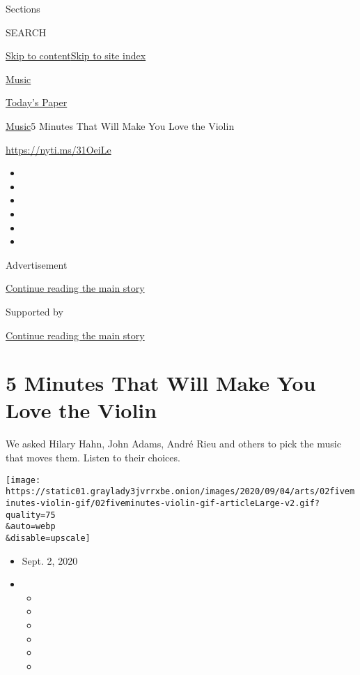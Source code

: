 Sections

SEARCH

\protect\hyperlink{site-content}{Skip to
content}\protect\hyperlink{site-index}{Skip to site index}

\href{https://www.nytimes3xbfgragh.onion/section/arts/music}{Music}

\href{https://myaccount.nytimes3xbfgragh.onion/auth/login?response_type=cookie\&client_id=vi}{}

\href{https://www.nytimes3xbfgragh.onion/section/todayspaper}{Today's
Paper}

\href{/section/arts/music}{Music}\textbar{}5 Minutes That Will Make You
Love the Violin

\url{https://nyti.ms/31OeiLe}

\begin{itemize}
\item
\item
\item
\item
\item
\item
\end{itemize}

Advertisement

\protect\hyperlink{after-top}{Continue reading the main story}

Supported by

\protect\hyperlink{after-sponsor}{Continue reading the main story}

\hypertarget{5-minutes-that-will-make-you-love-the-violin}{%
\section{5 Minutes That Will Make You Love the
Violin}\label{5-minutes-that-will-make-you-love-the-violin}}

We asked Hilary Hahn, John Adams, André Rieu and others to pick the
music that moves them. Listen to their choices.

\texttt{[image: https://static01.graylady3jvrrxbe.onion/images/2020/09/04/arts/02fiveminutes-violin-gif/02fiveminutes-violin-gif-articleLarge-v2.gif?quality=75\\\&auto=webp\\\&disable=upscale]}

\begin{itemize}
\item
  Sept. 2, 2020
\item
  \begin{itemize}
  \item
  \item
  \item
  \item
  \item
  \item
  \end{itemize}
\end{itemize}


